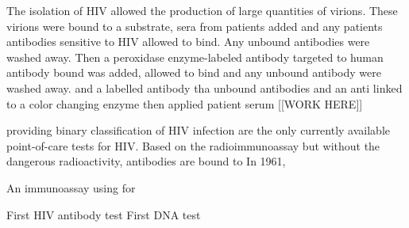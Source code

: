 \documentclass[../sherrill-Mix_thesis.tex]{subfiles}
\begin{document}
	The isolation of HIV \citep{Barre-Sinoussi1983,Gallo1983,Popovic1984,Levy1984} allowed the production of large quantities of virions. These virions were bound to a substrate, sera from patients added and any patients antibodies sensitive to HIV allowed to bind. Any unbound antibodies were washed away. Then a peroxidase enzyme-labeled antibody targeted to human antibody bound was added, allowed to bind and any unbound antibody were washed away.  and a labelled antibody tha  unbound antibodies and an anti linked to a color changing enzyme then applied patient serum \citep{Safai1984,Sarngadharan1984} [[WORK HERE]]
	
	providing binary classification of HIV infection are the only currently available point-of-care tests for HIV. Based on the radioimmunoassay \citep{Yalow1960} but without the dangerous radioactivity, antibodies are bound \citep{} to 
	In 1961, \citet{}

	An immunoassay using  for 


	First HIV antibody test  First DNA test \citep{Ou1988}
\end{document}
